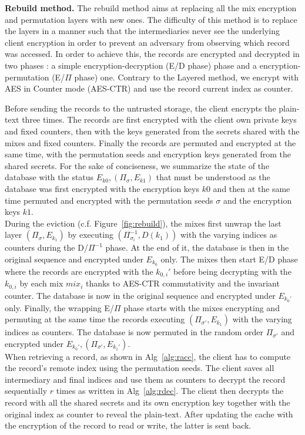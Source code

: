 \documentclass[USenglish,oneside,twocolumn]{article}
\begin{document}
\noindent\textbf{Rebuild method.} The rebuild method aims at replacing all the mix encryption and permutation layers with new ones. The difficulty of this method is to replace the layers in a manner such that the intermediaries never see the underlying client encryption in order to prevent an adversary from observing which record was accessed.
In order to achieve this, the records are encrypted and decrypted in two phases : a simple encryption-decryption (E/D phase) phase and a encryption-permutation (E/$\Pi$ phase) one. Contrary to the Layered method, we encrypt with AES in Counter mode (AES-CTR) and use the record current index as counter.

Before sending the records to the untrusted storage, the client encrypts the plain-text three times. The records are first encrypted with the client own private keys and fixed counters, then with the keys generated from the secrets shared with the mixes and fixed counters. Finally the records are permuted and encrypted at the same time, with the permutation seeds and encryption keys generated from the shared secrets.
For the sake of conciseness, we summarize the state of the database with the status $E_{k0}, (\Pi_\sigma, E_{k1})$ that must be understood as the database was first encrypted with the encryption keys $k0$ and then at the same time permuted and encrypted with the permutation seeds $\sigma$ and the encryption keys $k1$.\\

During the eviction (c.f. Figure~\ref{fig:rebuild}), the mixes first unwrap the last layer $(\Pi_\sigma, E_{k_1})$ by executing $(\Pi_{\sigma_i}^{-1}, D(k_1))$ with the varying indices as counters during the D/$\Pi^{-1}$ phase. At the end of it, the database is then in the original sequence and encrypted under $E_{k_0}$ only. 
The mixes then start E/D phase where the records are encrypted with the $k_{0,i}'$ before being decrypting with the $k_{0,i}$ by each mix $mix_i$ thanks to AES-CTR commutativity and the invariant counter. The database is now in the original sequence and encrypted under $E_{k_0'}$ only. 
Finally, the wrapping E/$\Pi$ phase starts with the mixes encrypting and permuting at the same time the records executing $(\Pi_{\sigma'}, E_{k_1})$ with the varying indices as counters. The database is now permuted in the random order $\Pi_{\sigma'}$ and encrypted under $E_{k_0'}, (\Pi_{\sigma'}, E_{k_1'})$.\\  

When retrieving a record, as shown in Alg~\ref{alg:racc}, the client has to compute the record's remote index using the permutation seeds. The client saves all intermediary and final indices and use them as counters to decrypt the record sequentially $r$ times as written in Alg~\ref{alg:rdec}. The client then decrypts the record with all the shared secrets and its own encryption key together with the original index as counter to reveal the plain-text. After updating the cache with the encryption of the record to read or write, the latter is sent back.
\end{document}

